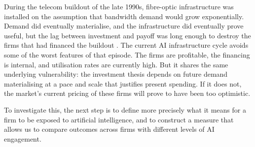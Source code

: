 During the telecom buildout of the late 1990s, fibre-optic infrastructure was installed on the assumption that bandwidth demand would grow exponentially. Demand did eventually materialise, and the infrastructure did eventually prove useful, but the lag between investment and payoff was long enough to destroy the firms that had financed the buildout \citep{golan2025}. The current AI infrastructure cycle avoids some of the worst features of that episode. The firms are profitable, the financing is internal, and utilisation rates are currently high. But it shares the same underlying vulnerability: the investment thesis depends on future demand materialising at a pace and scale that justifies present spending. If it does not, the market's current pricing of these firms will prove to have been too optimistic.

To investigate this, the next step is to define more precisely what it means for a firm to be exposed to artificial intelligence, and to construct a measure that allows us to compare outcomes across firms with different levels of AI engagement.